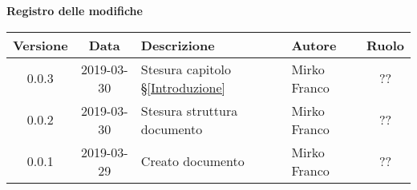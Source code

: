 	\begin{center}
		\textbf{Registro delle modifiche}
	\end{center}
	\begin{center}
		\begin{tabularx}{\textwidth}{|c|c|X|X|c|}
			\hline
			\textbf{Versione} & \textbf{Data} & \textbf{Descrizione} & \textbf{Autore} & \textbf{Ruolo} \\
			\hline
			0.0.3 & 2019-03-30 & Stesura capitolo \S\ref{Introduzione} & Mirko Franco & ?? \\
			\hline
			0.0.2 & 2019-03-30 & Stesura struttura documento & Mirko Franco & ?? \\
			\hline
			0.0.1 & 2019-03-29 & Creato documento & Mirko Franco & ?? \\
			\hline
		\end{tabularx}
	\end{center}
\newpage